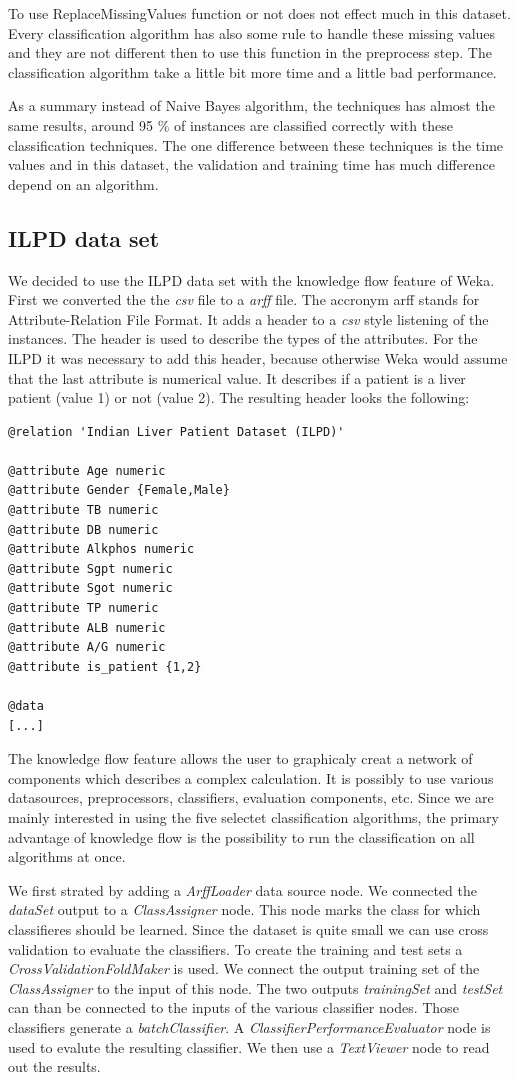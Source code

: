 \documentclass[a4paper]{article}
\begin{document}
To use ReplaceMissingValues function or not does not effect much in this
dataset. Every classification algorithm has also some rule to handle these
missing values and they are not different then to use this function in the
preprocess step. The classification algorithm take a little bit more time and a
little bad performance.

As a summary instead of Naive Bayes algorithm, the techniques has almost the
same results, around 95 $\%$ of instances are classified correctly with these
classification techniques. The one difference between these techniques is the
time values and in this dataset, the validation and training time has much
difference depend on an algorithm.  

\subsection{ILPD data set}
We decided to use the ILPD data set with the knowledge flow feature of Weka.
First we converted the the \emph{csv} file to a \emph{arff} file. The accronym
arff stands for Attribute-Relation File Format. It adds a header to a \emph{csv}
style listening of the instances. The header is used to describe the types of
the attributes. For the ILPD it was necessary to add this header, because
otherwise Weka would assume that the last attribute is numerical value. It
describes if a patient is a liver patient (value 1) or not (value 2). 
The resulting header looks the following:
\begin{verbatim}
@relation 'Indian Liver Patient Dataset (ILPD)'

@attribute Age numeric
@attribute Gender {Female,Male}
@attribute TB numeric
@attribute DB numeric
@attribute Alkphos numeric
@attribute Sgpt numeric
@attribute Sgot numeric
@attribute TP numeric
@attribute ALB numeric
@attribute A/G numeric
@attribute is_patient {1,2}

@data
[...]
\end{verbatim}

The knowledge flow feature allows the user to graphicaly creat a network of
components which describes a complex calculation. It is possibly to use various
datasources, preprocessors, classifiers, evaluation components, etc. Since we
are mainly interested in using the five selectet classification algorithms, the
primary advantage of knowledge flow is the possibility to run the classification
on all algorithms at once. 

We first strated by adding a \emph{ArffLoader} data source node. We connected
the \emph{dataSet} output to a \emph{ClassAssigner} node. This node marks the
class for which classifieres should be learned. Since the dataset is quite small
we can use cross validation to evaluate the classifiers. To create the training
and test sets a \emph{CrossValidationFoldMaker} is used. We connect the output
training set of the \emph{ClassAssigner} to the input of this node. The two
outputs \emph{trainingSet} and \emph{testSet} can than be connected to the
inputs of the various classifier nodes. Those classifiers generate a
\emph{batchClassifier}. A \emph{ClassifierPerformanceEvaluator} node is used to
evalute the resulting classifier. We then use a \emph{TextViewer} node to read
out the results.
\end{document}
